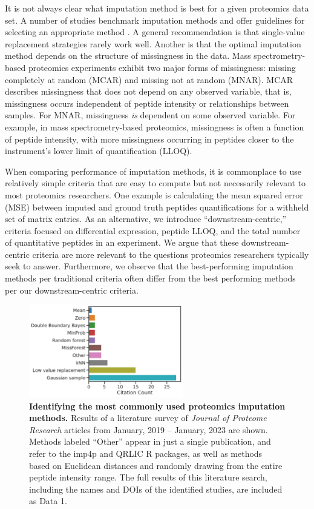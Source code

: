 \documentclass{article}
\begin{document}
It is not always clear what imputation method is best for a given proteomics data set. A number of studies benchmark imputation methods and offer guidelines for selecting an appropriate method \cite{Bramer:review, Webb-Robertson:review, DIMA, lazar, valikangas, dabke}. A general recommendation is that single-value replacement strategies rarely work well. Another is that the optimal imputation method depends on the structure of missingness in the data. Mass spectrometry-based proteomics experiments exhibit two major forms of missingness: missing completely at random (MCAR) and missing not at random (MNAR). MCAR describes missingness that does not depend on any observed variable, that is, missingness occurs independent of peptide intensity or relationships between samples. For MNAR, missingness \textit{is} dependent on some observed variable. For example, in mass spectrometry-based proteomics, missingness is often a function of peptide intensity, with more missingness occurring in peptides closer to the instrument's lower limit of quantification (LLOQ).

When comparing performance of imputation methods, it is commonplace to use relatively simple criteria that are easy to compute but not necessarily relevant to most proteomics researchers. One example is calculating the mean squared error (MSE) between imputed and ground truth peptides quantifications for a withheld set of matrix entries. As an alternative, we introduce ``downstream-centric,'' criteria focused on differential expression, peptide LLOQ, and the total number of quantitative peptides in an experiment. We argue that these downstream-centric criteria are more relevant to the questions proteomics researchers typically seek to answer. Furthermore, we observe that the best-performing imputation methods per traditional criteria often differ from the best performing methods per our downstream-centric criteria. 

\begin{figure}
  \begin{center}
    \includegraphics[width=0.6\textwidth]{figures/literature-survey-figure.pdf}
  \end{center}
  \caption{{\bf Identifying the most commonly used proteomics imputation methods.} Results of a literature survey of \textit{Journal of Proteome Research} articles from January, 2019 -- January, 2023 are shown. Methods labeled ``Other'' appear in just a single publication, and refer to the imp4p and QRLIC R packages, as well as methods based on Euclidean distances and randomly drawing from the entire peptide intensity range.  The full results of this literature search, including the names and DOIs of the identified studies, are included as Data 1.}
  \label{fig:citation-counts}
\end{figure} 
\end{document}
